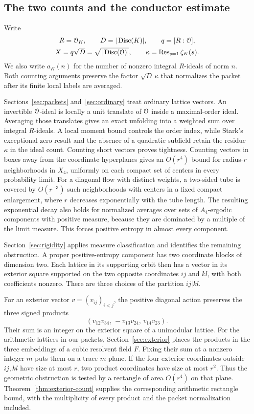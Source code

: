 \subsection{The two counts and the conductor estimate}

Write
\[
 \begin{gathered}
 R=\mathcal O_K,\qquad D=|\operatorname{Disc}(K)|,\qquad q=[R:\mathcal O],\\
 X=q\sqrt D=\sqrt{|\operatorname{Disc}(\mathcal O)|},\qquad
 \kappa=\operatorname{Res}_{s=1}\zeta_K(s).
 \end{gathered}
\]
We also write $a_K(n)$ for the number of nonzero integral $R$-ideals of
norm $n$.  Both counting arguments preserve the factor $\sqrt D\,\kappa$
that normalizes the packet after its finite local labels are averaged.

Sections~\ref{sec:packets} and~\ref{sec:ordinary} treat ordinary lattice
vectors.  An invertible $\mathcal O$-ideal is locally a unit translate of $\mathcal O$
inside a maximal-order ideal.  Averaging those translates gives an exact
unfolding into a weighted sum over integral $R$-ideals.  A local moment
bound controls the order index, while Stark's exceptional-zero result and
the absence of a quadratic subfield retain the residue $\kappa$ in the
ideal count.  Counting short vectors proves tightness.  Counting vectors
in boxes away from the coordinate hyperplanes gives an $O(r^4)$ bound for
radius-$r$ neighborhoods in $X_4$, uniformly on each compact set of centers
in every probability limit.  For a diagonal flow with distinct weights,
a two-sided tube is covered by $O(r^{-3})$ such neighborhoods with centers
in a fixed compact enlargement, where $r$ decreases exponentially with the
tube length.  The resulting exponential decay also holds for normalized
averages over sets of $A_4$-ergodic components with positive measure,
because they are dominated by a multiple of the limit measure.  This forces
positive entropy in almost every component.

Section~\ref{sec:rigidity} applies measure classification and identifies
the remaining obstruction.  A proper positive-entropy component has two
coordinate blocks of dimension two.  Each lattice in its supporting orbit
then has a vector in its exterior square supported on the two opposite
coordinates $ij$ and $kl$, with both coefficients nonzero.  There are three
choices of the partition $ij|kl$.

For an exterior vector $v=(v_{ij})_{i<j}$, the positive diagonal action
preserves the three signed products
\[
 (v_{12}v_{34},\,-v_{13}v_{24},\,v_{14}v_{23}).
\]
Their sum is an integer on the exterior square of a unimodular lattice.
For the arithmetic lattices in our packets, Section~\ref{sec:exterior}
places the products in the three embeddings of a cubic resolvent field
$F$.  Fixing their sum at a nonzero integer $m$ puts them on a trace-$m$
plane.  If the four exterior coordinates outside $ij,kl$ have size at most
$r$, two product coordinates have size at most $r^2$.  Thus the geometric
obstruction is tested by a rectangle of area $O(r^4)$ on that plane.
Theorem~\ref{thm:exterior-count} supplies the corresponding arithmetic
rectangle bound, with the multiplicity of every product and the packet
normalization included.

